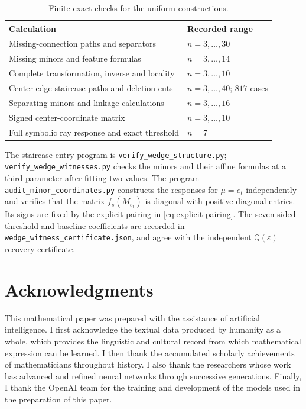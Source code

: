 \documentclass[11pt]{article}
\theoremstyle{definition}
\begin{document}
\begin{table}[htbp]
\centering
\small
\begin{tabular}{@{}p{.55\linewidth}p{.37\linewidth}@{}}
\toprule
Calculation & Recorded range\\
\midrule
Missing-connection paths and separators & $n=3,\ldots,30$\\
Missing minors and feature formulas & $n=3,\ldots,14$\\
Complete transformation, inverse and locality & $n=3,\ldots,10$\\
Center-edge staircase paths and deletion cuts & $n=3,\ldots,40$; $817$ cases\\
Separating minors and linkage calculations & $n=3,\ldots,16$\\
Signed center-coordinate matrix & $n=3,\ldots,10$\\
Full symbolic ray response and exact threshold & $n=7$\\
\bottomrule
\end{tabular}
\caption{Finite exact checks for the uniform constructions.}
\label{tab:computations}
\end{table}

The staircase entry program is
\nolinkurl{verify_wedge_structure.py};
\nolinkurl{verify_wedge_witnesses.py} checks the minors and their
affine formulas at a third parameter after fitting two values.
The program \nolinkurl{audit_minor_coordinates.py} constructs the
responses for $\mu=e_t$ independently and verifies that the matrix
$f_s(M_{e_t})$ is diagonal with positive diagonal entries. Its signs
are fixed by the explicit pairing in \eqref{eq:explicit-pairing}.
The seven-sided threshold and baseline coefficients are recorded in
\nolinkurl{wedge_witness_certificate.json}, and agree with the
independent $\mathbb Q(\varepsilon)$ recovery certificate.

\section*{Acknowledgments}

This mathematical paper was prepared with the assistance of artificial intelligence.  I
first acknowledge the textual data produced by humanity as a whole, which
provides the linguistic and cultural record from which mathematical expression
can be learned.  I then thank the accumulated scholarly achievements of
mathematicians throughout history.  I also thank the researchers whose work has
advanced and refined neural networks through successive generations.  Finally,
I thank the OpenAI team for the training and development of the models used in
the preparation of this paper.
\end{document}
